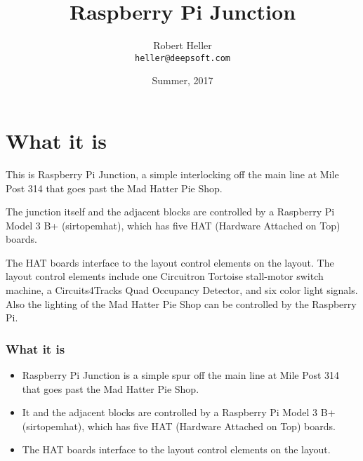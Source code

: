 \documentclass[ignorenonframetext]{beamer}
\title{Raspberry Pi Junction}
\author{Robert Heller \\ \texttt{heller@deepsoft.com}}
\institute{Deepwoods Software}
\date{Summer, 2017}
\begin{document}
\begin{frame}
  \titlepage
\end{frame}





\section{What it is}

This is Raspberry Pi Junction, a simple interlocking off the main line at Mile 
Post 314 that goes past the Mad Hatter Pie Shop.

The junction itself and the adjacent blocks are controlled by a Raspberry Pi 
Model 3 B+ (sirtopemhat), which has five HAT (Hardware Attached on Top) boards.

The HAT boards interface to the layout control elements on the layout. The
layout control elements include one Circuitron Tortoise stall-motor switch
machine, a Circuits4Tracks Quad Occupancy Detector, and six color light
signals.  Also the lighting of the Mad Hatter Pie Shop can be controlled by 
the Raspberry Pi.

\begin{frame}
   \frametitle{What it is}
   \begin{itemize}
   \item Raspberry Pi Junction is a simple spur off the main line at Mile Post 
   314 that goes past the Mad Hatter Pie Shop. 
   \item It and the adjacent blocks are controlled by a Raspberry Pi Model 3 
   B+ (sirtopemhat), which has five HAT (Hardware Attached on Top) boards.
   \item The HAT boards interface to the layout control elements on the 
   layout.
   \end{itemize}
\end{frame} 
\end{document}
